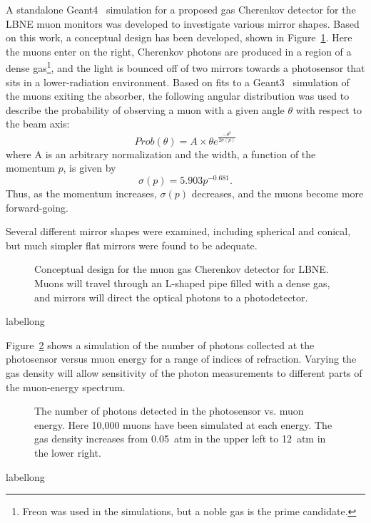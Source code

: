 A standalone Geant4~\cite{GEANT4:NIM}  
simulation for a proposed gas Cherenkov detector
for the LBNE muon monitors was developed to investigate various mirror
shapes.  Based on this work, a conceptual design has been developed,
 shown in Figure~\ref{fig:mirrors}.  Here the muons enter on the
right, Cherenkov photons are produced in a region of a dense
gas\footnote{Freon was used in the simulations, but a noble gas is the
prime candidate.}, and the light is bounced off of two mirrors towards a
photosensor that sits in a lower-radiation environment. Based on fits
to a Geant3~\cite{Geant3}  simulation of the muons exiting the absorber, the
following angular distribution was used to describe the probability of
observing a muon with a given angle $\theta$ with respect to the beam axis:
\begin{equation}
Prob(\theta)=A \times \theta e^{\frac{-\theta^2}{2\sigma (p)}}
\end{equation}
where A is an arbitrary normalization and the width, a function of
the momentum $p$, is given by
\begin{equation}
\sigma (p) = 5.903 p^{-0.681}.
\end{equation}
Thus, as the momentum increases, $\sigma (p)$ decreases, and the muons
become more forward-going.

Several different mirror shapes were examined, including spherical and 
conical, but much simpler flat mirrors were found to be adequate. 


\begin{figure}[htbp]
\centering
\caption[Muon gas Cherenkov counter design]
{Conceptual design for the muon gas Cherenkov detector for LBNE.  
Muons will travel through an L-shaped pipe filled with a dense gas,
and mirrors will direct the optical photons to a photodetector. }

\label{fig:mirrors}
\end{figure}
\begin{cdrfigure}[short]{label}{long}
\end{cdrfigure}

Figure~\ref{fig:varyindex} shows a simulation of 
the number of photons collected at the photosensor versus muon energy for
a range of indices of refraction.  Varying the gas density will allow sensitivity of 
the photon measurements to different parts of the muon-energy spectrum.

\begin{figure}[htbp]
\centering
\caption[Cherenkov counter response to muons]
{The number of photons detected in the photosensor vs. muon energy.  
Here 10,000 muons have been simulated at each energy.  The gas density
increases from 0.05~atm in the upper left to 12~atm in the lower
right. }
\label{fig:varyindex}
\end{figure}
\begin{cdrfigure}[short]{label}{long}
\end{cdrfigure}

